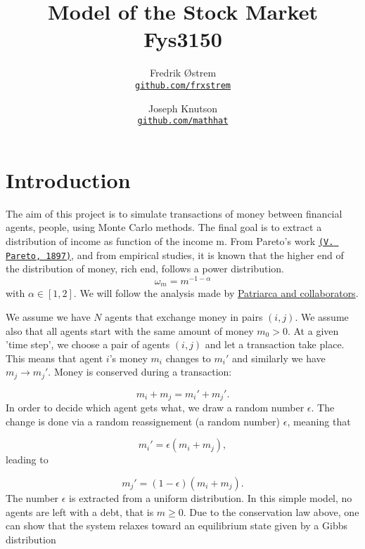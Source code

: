 \documentclass[10pt, a4paper]{article}
\title{Model of the Stock Market \\
  \hrulefill\small{ Fys3150 }\hrulefill}
\author{Fredrik Østrem \\  \href{https://github.com/frxstrem/fys3150/tree/master/project5}{\texttt{github.com/frxstrem}}
 \and Joseph Knutson \\ \href{https://github.com/mathhat/Computational_Physics/tree/master/prosjekt5}{\texttt{github.com/mathhat}}}
\begin{document}
\begin{titlepage}
\maketitle
\begin{abstract}

\end{abstract}

\tableofcontents
\end{titlepage}
\section{Introduction}
The aim of this project is to simulate transactions of money between financial
agents, people, using Monte Carlo methods. The final goal is to extract a distribution of
income as function of the income m. From Pareto’s work \href{http://www.institutcoppet.org/2012/05/08/cours-deconomie-politique-1896-de-vilfredo-pareto}{\texttt{(V. Pareto, 1897)}}, 
and from empirical studies, it is known that the higher end of the distribution of money, rich end, follows a power distribution.
$$\omega_{m} = m^{-1-\alpha} $$
with $\alpha\in [1,2]$. We will follow the analysis made by \href{{http://www.sciencedirect.com/science/article/pii/S0378437104004327}}{Patriarca and collaborators}. 

We assume we have $N$ agents that exchange money in pairs $(i,j)$. We assume also that all agents
start with the same amount of money $m_0 > 0$. At a given 'time step', we choose a pair
of agents $(i,j)$ and let a transaction take place. This means that agent $i$'s money $m_i$ changes
to $m_i'$ and similarly we have $m_j\rightarrow m_j'$. 
Money is conserved during a transaction:

\begin{equation}
  m_i+m_j=m_i'+m_j'.
  \label{eq:conserve}
\end{equation}
In order to decide which agent gets what, we draw a random number $\epsilon$. 
The change is done via a random reassignement (a random number) $\epsilon$, meaning that

\begin{equation}
m_i' = \epsilon(m_i+m_j),\label{eq:eps1}
\end{equation}
leading to

\begin{equation}
m_j'= (1-\epsilon)(m_i+m_j).\label{eq:eps2}
\end{equation}
The number $\epsilon$ is extracted from a uniform distribution.
In this simple model, no agents are left with a debt, that is $m\ge 0$.
Due to the conservation law above, one can show that the system relaxes toward an equilibrium
state given by a Gibbs distribution
\end{document}
